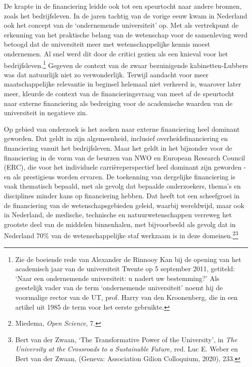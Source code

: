 \documentclass[smallauthor, chapterhaspagenum, nochapterinheader, pagenuminheader,  bigchapnum,medium2, tocpages,  garamond, titleinheader]{jote-book}
\begin{document}
	De krapte in de financiering leidde ook tot een speurtocht naar andere bronnen, zoals het bedrijfsleven. In de jaren tachtig van de vorige eeuw kwam in Nederland ook het concept van de ‘ondernemende universiteit' op. Met als vertrekpunt de erkenning van het praktische belang van de wetenschap voor de samenleving werd betoogd dat de universiteit meer met wetenschappelijke kennis moest ondernemen. Al snel werd dit door de critici gezien als een knieval voor het bedrijfsleven.\footnote{Zie de boeiende rede van Alexander de Rinnooy Kan bij de opening van het academisch jaar van de universiteit Twente op 5 september 2011, getiteld: ‘Naar een ondernemende universiteit: u nadert uw bestemming?' Als geestelijk vader van de term ‘ondernemende universiteit' noemt hij de voormalige rector van de UT, prof. Harry van den Kroonenberg, die in een artikel uit 1985 de term voor het eerste gebruikte.} Gegeven de context van de zwaar bezuinigende kabinetten-Lubbers was dat natuurlijk niet zo verwonderlijk. Terwijl aandacht voor meer maatschappelijke relevantie in beginsel helemaal niet verkeerd is, waarover later meer, kleurde de context van de financieringsvraag van meet af de speurtocht naar externe financiering als bedreiging voor de academische waarden van de universiteit in negatieve zin.



	Op gebied van onderzoek is het zoeken naar externe financiering heel dominant geworden. Dat geldt in zijn algemeenheid, inclusief overheidsfinanciering en financiering vanuit het bedrijfsleven. Maar het geldt in het bijzonder voor de financiering in de vorm van de beurzen van NWO en European Research Council (ERC), die voor het individuele carrièreperspectief heel dominant zijn geworden - en als prestigieus worden ervaren. De toekenning van dergelijke financiering is vaak thematisch bepaald, met als gevolg dat bepaalde onderzoekers, thema's en disciplines minder kans op financiering hebben. Dat heeft tot een scheefgroei in de financiering van de wetenschapsgebieden geleid, waarbij wereldwijd, maar ook in Nederland, de medische, technische en natuurwetenschappen verreweg het grootste deel van de middelen binnenhalen, met bijvoorbeeld als gevolg dat in Nederland 70\% van de wetenschappelijke staf werkzaam is in deze domeinen.\footnote{Miedema, \emph{Open }\emph{Science}, 7.}\textsuperscript{\fbox{,}}\footnote{Bert van der Zwaan, ‘The Transformative Power of the University', in \emph{The University at }\emph{the}\emph{ Crossroads }\emph{to}\emph{ a }\emph{Sustainable}\emph{ }\emph{Future}\emph{,} red. Luc E. Weber en Bert van der Zwaan, (Geneva: Association Gilion Colloquium, 2020), 233.}
\end{document}
